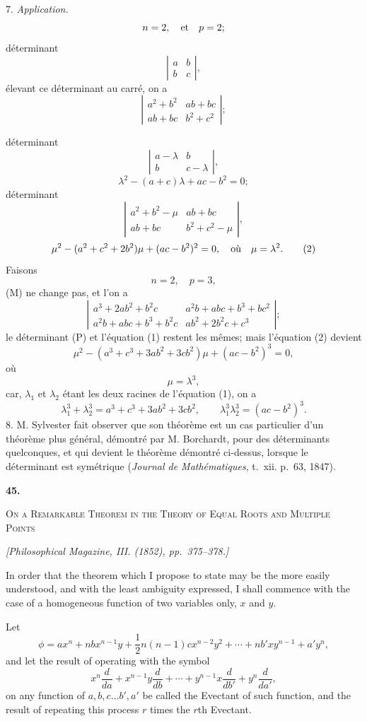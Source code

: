\documentclass[11pt]{article}
\newcommand{\paperhead}[3]{%
  \clearpage
  \begin{center}
  {\Large\bfseries #1.}\par\vspace{0.85em}
  {\large\scshape #2}\par\vspace{0.6em}
  {\itshape [#3]}\par
  \end{center}\vspace{0.4em}}
\newcommand{\sourcepage}[1]{\marginpar{\scriptsize p.~#1}}
\begin{document}
{{7. \emph{Application.}
\[
n=2,
\quad\hbox{et}\quad p=2;
\]
déterminant
\[
\left|\begin{array}{cc}a&b\\ b&c\end{array}\right|,
\tag{M}
\]
élevant ce déterminant au carré, on a
\[
\left|\begin{array}{cc}
a^2+b^2&ab+bc\\
ab+bc&b^2+c^2
\end{array}\right|;
\tag{N}
\]

\sourcepage{366}
déterminant
\[
\left|\begin{array}{cc}
a-\lambda&b\\ b&c-\lambda
\end{array}\right|,
\tag{P}
\]
\[
\lambda^2-(a+c)\lambda+ac-b^2=0;
\tag{1}
\]
déterminant
\[
\left|\begin{array}{cc}
a^2+b^2-\mu&ab+bc\\
ab+bc&b^2+c^2-\mu
\end{array}\right|,
\]
\[
\mu^2-(a^2+c^2+2b^2)\mu+(ac-b^2)^2=0,
\quad\hbox{où}\quad \mu=\lambda^2.
\tag{2}
\]
Faisons
\[
n=2,
\quad p=3,
\]
(M) ne change pas, et l'on a
\[
\left|\begin{array}{cc}
a^3+2ab^2+b^2c&a^2b+abc+b^3+bc^2\\
a^2b+abc+b^3+b^2c&ab^2+2b^2c+c^3
\end{array}\right|;
\tag{N}
\]
le déterminant (P) et l'équation (1) restent les mêmes; mais l'équation (2) devient
\[
\mu^2-(a^3+c^3+3ab^2+3cb^2)\mu+(ac-b^2)^3=0,
\]
où
\[
\mu=\lambda^3,
\]
car, $\lambda_1$ et $\lambda_2$ étant les deux racines de l'équation (1), on a
\[
\lambda_1^3+\lambda_2^3=a^3+c^3+3ab^2+3cb^2,
\qquad
\lambda_1^3\lambda_2^3=(ac-b^2)^3.
\]
8. M. Sylvester fait observer que son théorème est un cas particulier d'un théorème plus général, démontré par M. Borchardt, pour des déterminants quelconques, et qui devient le théorème démontré ci-dessus, lorsque le déterminant est symétrique (\emph{Journal de Mathématiques}, t.~xii. p.~63, 1847).

\paperhead{45}{On a Remarkable Theorem in the Theory of Equal Roots and Multiple Points}{Philosophical Magazine, III. (1852), pp.~375--378.}

\sourcepage{367}
In order that the theorem which I propose to state may be the more easily understood, and with the least ambiguity expressed, I shall commence with the case of a homogeneous function of two variables only, $x$ and $y$.

Let
\[
\phi=ax^n+nbx^{n-1}y+\frac12n(n-1)cx^{n-2}y^2+\cdots+nb'xy^{n-1}+a'y^n,
\]
and let the result of operating with the symbol
\[
x^n\frac{d}{da}+x^{n-1}y\frac{d}{db}+\cdots+y^{n-1}x\frac{d}{db'}+y^n\frac{d}{da'},
\]
on any function of $a,b,c\ldots b',a'$ be called the Evectant of such function, and the result of repeating this process $r$ times the $r$th Evectant.

}}
\end{document}
